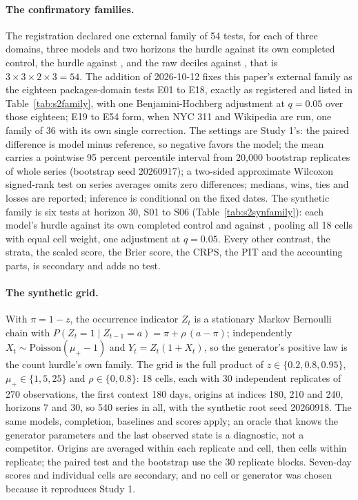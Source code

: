 \paragraph{The confirmatory families.} The registration declared one external family of 54 tests, for each
of three domains, three models and two horizons the hurdle against its own completed control, the hurdle
against \hc{}, and the raw deciles against \lm{}, that is $3 \times 3 \times 2 \times 3 = 54$. The addition
of 2026-10-12 fixes this paper's external family as the eighteen packages-domain tests E01 to E18, exactly as
registered and listed in Table~\ref{tab:s2family}, with one Benjamini-Hochberg adjustment at $q = 0.05$ over
those eighteen; E19 to E54 form, when NYC 311 and Wikipedia are run, one family of 36 with its own single
correction. The settings are Study 1's: the paired difference is model minus reference, so negative favors
the model; the mean carries a pointwise 95 percent percentile interval from 20,000 bootstrap replicates of
whole series (bootstrap seed 20260917); a two-sided approximate Wilcoxon signed-rank test on series averages
omits zero differences; medians, wins, ties and losses are reported; inference is conditional on the fixed
dates. The synthetic family is six tests at horizon 30, S01 to S06 (Table~\ref{tab:s2synfamily}): each
model's hurdle against its own completed control and against \hc{}, pooling all 18 cells with equal cell
weight, one adjustment at $q = 0.05$. Every other contrast, the strata, the scaled score, the Brier score,
the CRPS, the PIT and the accounting parts, is secondary and adds no test.

\paragraph{The synthetic grid.} With $\pi = 1 - z$, the occurrence indicator $Z_t$ is a stationary Markov
Bernoulli chain with $P(Z_t = 1 \mid Z_{t-1} = a) = \pi + \rho\,(a - \pi)$; independently $X_t \sim
\text{Poisson}(\mu_{+} - 1)$ and $Y_t = Z_t (1 + X_t)$, so the generator's positive law is the count
hurdle's own family. The grid is the full product of $z \in \{0.2, 0.8, 0.95\}$, $\mu_{+} \in \{1, 5, 25\}$
and $\rho \in \{0, 0.8\}$: 18 cells, each with 30 independent replicates of 270 observations, the first
context 180 days, origins at indices 180, 210 and 240, horizons 7 and 30, so 540 series in all, with the
synthetic root seed 20260918. The same models, completion, baselines and scores apply; an oracle that knows
the generator parameters and the last observed state is a diagnostic, not a competitor. Origins are averaged
within each replicate and cell, then cells within replicate; the paired test and the bootstrap use the 30
replicate blocks. Seven-day scores and individual cells are secondary, and no cell or generator was chosen
because it reproduces Study 1.

